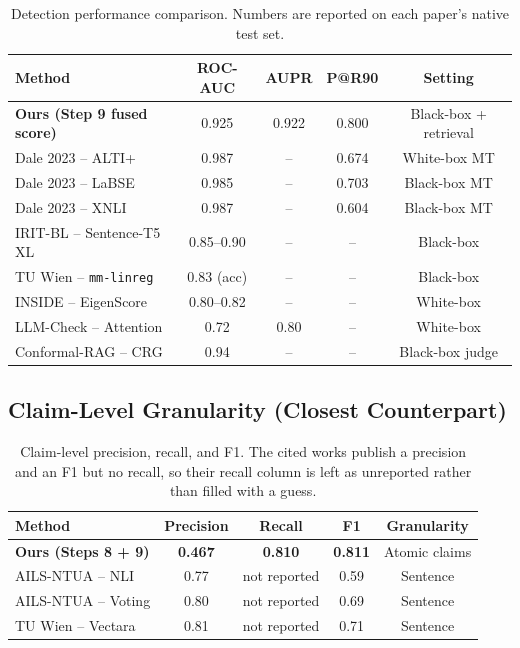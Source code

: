 \begin{table}[ht]
\centering
\small
\begin{tabular}{p{3.6cm}cccc}
\hline
\textbf{Method} & \textbf{ROC-AUC} & \textbf{AUPR} & \textbf{P@R90} & \textbf{Setting} \\
\hline
\textbf{Ours (Step 9 fused score)} & 0.925 & 0.922 & 0.800 & Black-box + retrieval \\
Dale 2023 -- ALTI+ & 0.987 & -- & 0.674 & White-box MT \\
Dale 2023 -- LaBSE & 0.985 & -- & 0.703 & Black-box MT \\
Dale 2023 -- XNLI & 0.987 & -- & 0.604 & Black-box MT \\
IRIT-BL -- Sentence-T5 XL & 0.85--0.90 & -- & -- & Black-box \\
TU Wien -- \texttt{mm-linreg} & 0.83 (acc) & -- & -- & Black-box \\
INSIDE -- EigenScore & 0.80--0.82 & -- & -- & White-box \\
LLM-Check -- Attention & 0.72 & 0.80 & -- & White-box \\
Conformal-RAG -- CRG & 0.94 & -- & -- & Black-box judge \\
\hline
\end{tabular}
\caption{Detection performance comparison. Numbers are reported on each
paper's native test set.}
\label{tab:detection-perf}
\end{table}

\subsection{Claim-Level Granularity (Closest Counterpart)}

\begin{table}[ht]
\centering
\small
\begin{tabular}{lcccc}
\hline
\textbf{Method} & \textbf{Precision} & \textbf{Recall} & \textbf{F1} & \textbf{Granularity} \\
\hline
\textbf{Ours (Steps 8 + 9)} & \textbf{0.467} & \textbf{0.810} & \textbf{0.811} & Atomic claims \\
AILS-NTUA -- NLI & 0.77 & not reported & 0.59 & Sentence \\
AILS-NTUA -- Voting & 0.80 & not reported & 0.69 & Sentence \\
TU Wien -- Vectara & 0.81 & not reported & 0.71 & Sentence \\
\hline
\end{tabular}
\caption{Claim-level precision, recall, and F1. The cited works publish a
precision and an F1 but no recall, so their recall column is left as
unreported rather than filled with a guess.}
\label{tab:claim-f1}
\end{table}

